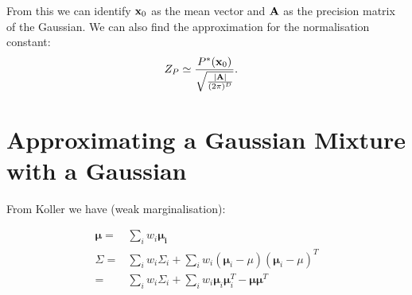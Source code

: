 From this we can identify ${\mathbf x}_{0}$ as the mean vector and ${\mathbf A}$
as the precision matrix of the Gaussian. We can also find the approximation
for the normalisation constant:
\begin{align}
Z_{P} & \simeq\frac{P^{*}({\mathbf x}_{0})}{\sqrt{\frac{|{\mathbf A}|}{(2\pi)^{D}}}}.
\end{align}



\section{Approximating a Gaussian Mixture with a Gaussian}

From Koller \cite[pg 620]{Koller2009} we have (weak marginalisation):

\begin{align}
\mathbf{\mu}= & \sum_{i}w_{i}\mathbf{\mathbf{\mu}_{i}}\\
\Sigma= & \sum_{i}w_{i}\Sigma_{i}+\sum_{i}w_{i}(\mathbf{\mu}_{i}-\mu)(\mathbf{\mu}_{i}-\mu)^{T}\nonumber \\
= & \sum_{i}w_{i}\Sigma_{i}+\sum_{i}w_{i}\mathbf{\mu}_{i}\mathbf{\mu}_{i}^{T}-\mathbf{\mu}\mathbf{\mu}^{T}\label{eq:gauss_approx_gmm}
\end{align}

